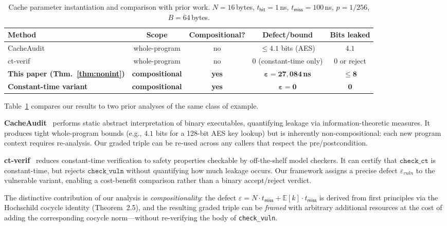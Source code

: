 \begin{table}[h]
\centering
\small
\caption{Cache parameter instantiation and comparison with prior work.
  $N=16$\,bytes, $t_\mathsf{hit}=1$\,ns, $t_\mathsf{miss}=100$\,ns,
  $p=1/256$, $B=64$\,bytes.}
\label{tab:comparison}
\begin{tabular}{lcccc}
\toprule
\textbf{Method} & \textbf{Scope} & \textbf{Compositional?}
  & \textbf{Defect/bound} & \textbf{Bits leaked} \\
\midrule
CacheAudit~\cite{doychev2013cacheaudit}
  & whole-program & no
  & $\leq 4.1$ bits (AES) & $4.1$ \\
ct-verif~\cite{almeida2016verifying}
  & whole-program & no
  & $0$ (constant-time only) & $0$ or reject \\
\textbf{This paper (Thm.~\ref{thm:nonint})}
  & \textbf{compositional} & \textbf{yes}
  & $\boldsymbol{\varepsilon = 27{,}084}$\,\textbf{ns}
  & $\boldsymbol{\leq 8}$ \\
\textbf{Constant-time variant}
  & \textbf{compositional} & \textbf{yes}
  & $\boldsymbol{\varepsilon = 0}$
  & $\boldsymbol{0}$ \\
\bottomrule
\end{tabular}
\end{table}

Table~\ref{tab:comparison} compares our results to two prior analyses
of the same class of example.

\textbf{CacheAudit}~\cite{doychev2013cacheaudit} performs static
abstract interpretation of binary executables, quantifying leakage via
information-theoretic measures.  It produces tight whole-program
bounds (e.g., $4.1$ bits for a 128-bit AES key lookup) but is
inherently non-compositional: each new program context requires
re-analysis.  Our graded triple can be re-used across any callers that
respect the pre/postcondition.

\textbf{ct-verif}~\cite{almeida2016verifying} reduces constant-time
verification to safety properties checkable by off-the-shelf model
checkers.  It can certify that $\mathtt{check\_ct}$ is constant-time,
but rejects $\mathtt{check\_vuln}$ without quantifying how much leakage
occurs.  Our framework assigns a precise defect $\varepsilon_\mathit{vuln}$
to the vulnerable variant, enabling a cost-benefit comparison rather
than a binary accept/reject verdict.

The distinctive contribution of our analysis is \emph{compositionality}:
the defect $\varepsilon = N \cdot t_\mathsf{miss} + \mathbb{E}[k]\cdot
t_\mathsf{miss}$ is derived from first principles via the Hochschild
cocycle identity (Theorem~2.5), and the resulting graded triple can be
\emph{framed} with arbitrary additional resources at the cost of
adding the corresponding cocycle norm—without re-verifying the body of
\texttt{check\_vuln}.
